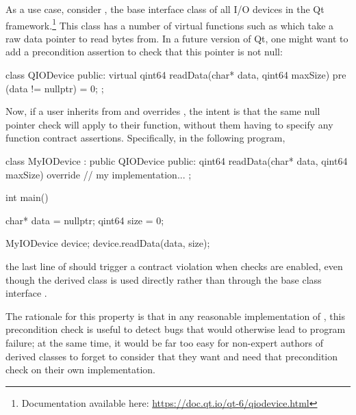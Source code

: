 As a use case, consider , the base interface class of all I/O devices in the Qt framework.\footnote{Documentation available here: \url{https://doc.qt.io/qt-6/qiodevice.html}} This class has a number of virtual functions such as  which take a raw data pointer to read bytes from. In a future version of Qt, one might want to add a precondition assertion to check that this pointer is not null:
\begin{codeblock}
class QIODevice {
public:
  virtual qint64 readData(char* data, qint64 maxSize)
    pre (data != nullptr) = 0;
};
\end{codeblock}
Now, if a user inherits from  and overrides , the intent is that the same null pointer check will apply to their function, without them having to specify any function contract assertions. Specifically, in the following program,
\begin{codeblock}
class MyIODevice : public QIODevice {
public:
  qint64 readData(char* data, qint64 maxSize) override {
    // my implementation...
  }
};

int main() {
  char* data = nullptr;
  qint64 size = 0;
  
  MyIODevice device;
  device.readData(data, size);
}
\end{codeblock}
the last line of  should trigger a contract violation when checks are enabled, even though the derived class  is used directly rather than through the base class interface . 

The rationale for this property is that in any reasonable implementation of , this precondition check is useful to detect bugs that would otherwise lead to program failure; at the same time, it would be far too easy for non-expert authors of derived classes to forget to consider that they want and need that precondition check on their own implementation.

